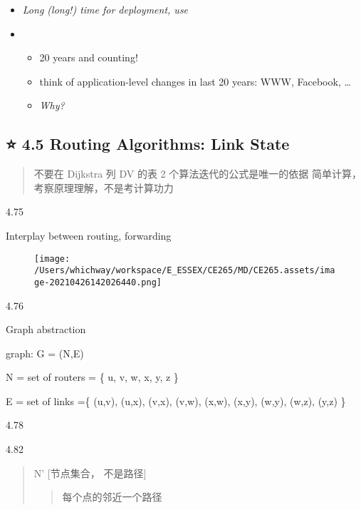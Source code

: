 \documentclass[
]{article}
\begin{document}
\begin{itemize}
\item
  \emph{Long (long!) time for deployment, use}
\item
  \begin{itemize}
  \item
    20 years and counting!
  \item
    think of application-level changes in last 20 years: WWW, Facebook,
    \ldots{}
  \item
    \emph{Why?}
  \end{itemize}
\end{itemize}

\hypertarget{-45-routing-algorithms-link-state}{%
\subsection{⭐️ 4.5 Routing Algorithms: Link
State}\label{-45-routing-algorithms-link-state}}

\begin{quote}
不要在 Dijkstra 列 DV 的表 2 个算法迭代的公式是唯一的依据
简单计算，考察原理理解，不是考计算功力
\end{quote}

4.75

Interplay between routing, forwarding

\begin{figure}
\centering
\texttt{[image: /Users/whichway/workspace/E\_ESSEX/CE265/MD/CE265.assets/image-20210426142026440.png]}
\caption{}
\end{figure}

4.76

Graph abstraction

graph: G = (N,E)

N = set of routers = \{ u, v, w, x, y, z \}

E = set of links =\{ (u,v), (u,x), (v,x), (v,w), (x,w), (x,y), (w,y),
(w,z), (y,z) \}

4.78

\begin{quote}
\end{quote}

4.82

\begin{quote}
N' {[}节点集合， 不是路径{]}

\begin{quote}
每个点的邻近一个路径
\end{quote}
\end{quote}
\end{document}
